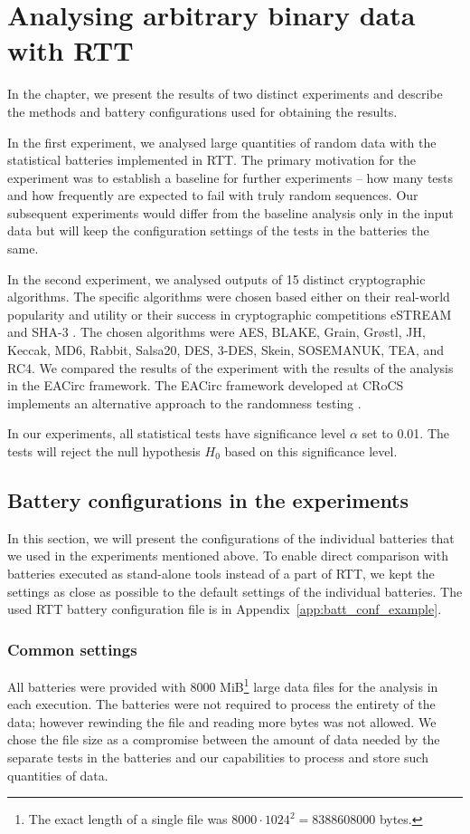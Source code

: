 \documentclass[
	digital,    %
	oneside,    %
	color,
	11pt,
	nocover,
	notable,
	nolof,
	nolot,
]{fithesis3}
\theoremstyle{definition}
\theoremstyle{remark}
\begin{document}
\chapter{Analysing arbitrary binary data with RTT}
\label{chap:crypto_fn_analysis}

In the chapter, we present the results of two distinct experiments and describe the methods and battery configurations used for obtaining the results.

In the first experiment, we analysed large quantities of random data with the statistical batteries implemented in RTT. The primary motivation for the experiment was to establish a baseline for further experiments -- how many tests and how frequently are expected to fail with truly random sequences. Our subsequent experiments would differ from the baseline analysis only in the input data but will keep the configuration settings of the tests in the batteries the same.

In the second experiment, we analysed outputs of 15 distinct cryptographic algorithms. The specific algorithms were chosen based either on their real-world popularity and utility or their success in cryptographic competitions eSTREAM \cite{estream-competition} and SHA-3 \cite{sha3-competition}. The chosen algorithms were AES, BLAKE, Grain, Gr\o stl, JH, Keccak, MD6, Rabbit, Salsa20, DES, 3-DES, Skein, SOSEMANUK, TEA, and RC4. We compared the results of the experiment with the results of the analysis in the EACirc framework. The EACirc framework developed at CRoCS implements an alternative approach to the randomness testing \cite{eacirc-github}.

In our experiments, all statistical tests have significance level $\alpha$ set to 0.01. The tests will reject the null hypothesis $H_0$ based on this significance level.

\section{Battery configurations in the experiments}
\label{sec:configuration_of_batteries}
In this section, we will present the configurations of the individual batteries that we used in the experiments mentioned above. To enable direct comparison with batteries executed as stand-alone tools instead of a part of RTT, we kept the settings as close as possible to the default settings of the individual batteries. The used RTT battery configuration file is in Appendix~\ref{app:batt_conf_example}.

\subsection{Common settings}
All batteries were provided with 8000 MiB\footnote{The exact length of a single file was $8000 \cdot 1024^2 = 8388608000$ bytes.} large data files for the analysis in each execution. The batteries were not required to process the entirety of the data; however rewinding the file and reading more bytes was not allowed. We chose the file size as a compromise between the amount of data needed by the separate tests in the batteries and our capabilities to process and store such quantities of data.
\end{document}
